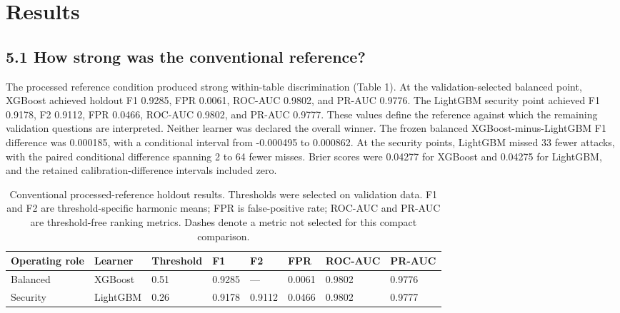 \documentclass[preprint,12pt]{elsarticle}
\begin{document}
\section{Results}

\subsection{5.1 How strong was the conventional reference?}
The processed reference condition produced strong within-table discrimination (Table 1). At the validation-selected balanced point, XGBoost achieved holdout F1 0.9285, FPR 0.0061, ROC-AUC 0.9802, and PR-AUC 0.9776. The LightGBM security point achieved F1 0.9178, F2 0.9112, FPR 0.0466, ROC-AUC 0.9802, and PR-AUC 0.9777. These values define the reference against which the remaining validation questions are interpreted.
Neither learner was declared the overall winner. The frozen balanced XGBoost-minus-LightGBM F1 difference was 0.000185, with a conditional interval from -0.000495 to 0.000862. At the security points, LightGBM missed 33 fewer attacks, with the paired conditional difference spanning 2 to 64 fewer misses. Brier scores were 0.04277 for XGBoost and 0.04275 for LightGBM, and the retained calibration-difference intervals included zero.
\begin{table}[htbp]
\centering
\small
\caption{Conventional processed-reference holdout results. Thresholds were selected on validation data. F1 and F2 are threshold-specific harmonic means; FPR is false-positive rate; ROC-AUC and PR-AUC are threshold-free ranking metrics. Dashes denote a metric not selected for this compact comparison.}
\begin{tabularx}{\textwidth}{@{}XXXXXXXX@{}}
\toprule
Operating role & Learner & Threshold & F1 & F2 & FPR & ROC-AUC & PR-AUC \\
\midrule
Balanced & XGBoost & 0.51 & 0.9285 & --- & 0.0061 & 0.9802 & 0.9776 \\
Security & LightGBM & 0.26 & 0.9178 & 0.9112 & 0.0466 & 0.9802 & 0.9777 \\
\bottomrule
\end{tabularx}
\end{table}
\end{document}
